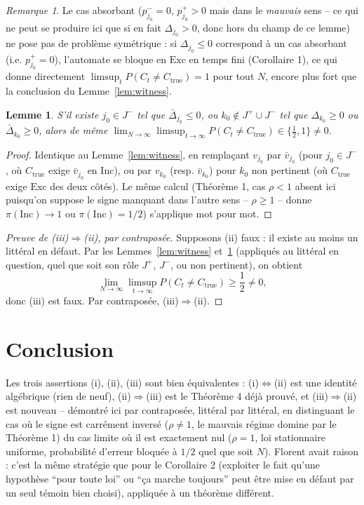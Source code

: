 \documentclass[11pt]{article}
\newtheorem{lemma}{Lemme}
\theoremstyle{remark}
\newtheorem{remark}[theorem]{Remarque}
\newcommand{\Inc}{\ensuremath{\mathrm{Inc}}}
\newcommand{\Exc}{\ensuremath{\mathrm{Exc}}}
\newcommand{\vbar}{\bar{v}}
\begin{document}
\begin{remark}
Le cas absorbant ($p_{j_0}^-=0$, $p_{j_0}^+>0$ mais dans le \emph{mauvais}
sens -- ce qui ne peut se produire ici que si en fait $\Delta_{j_0}>0$, donc
hors du champ de ce lemme) ne pose pas de problème symétrique : si
$\Delta_{j_0}\le0$ correspond à un cas absorbant (i.e. $p_{j_0}^+=0$),
l'automate se bloque en $\Exc$ en temps fini (Corollaire 1), ce qui donne
directement $\limsup_t P(C_t\ne C_{\mathrm{true}})=1$ pour tout $N$, encore
plus fort que la conclusion du Lemme~\ref{lem:witness}.
\end{remark}

\begin{lemma}\label{lem:witness-neg}
S'il existe $j_0\in J^-$ tel que $\bar\Delta_{j_0}\le0$, ou $k_0\notin
J^+\cup J^-$ tel que $\Delta_{k_0}\ge0$ ou $\bar\Delta_{k_0}\ge0$, alors de
même $\lim_{N\to\infty}\limsup_{t\to\infty}P(C_t\ne C_{\mathrm{true}})\in\{\tfrac12,1\}\ne0$.
\end{lemma}

\begin{proof}
Identique au Lemme~\ref{lem:witness}, en remplaçant $v_{j_0}$ par
$\vbar_{j_0}$ (pour $j_0\in J^-$, où $C_{\mathrm{true}}$ exige $\vbar_{j_0}$
en $\Inc$), ou par $v_{k_0}$ (resp. $\vbar_{k_0}$) pour $k_0$ non pertinent
(où $C_{\mathrm{true}}$ exige $\Exc$ des deux côtés). Le même calcul
(Théorème 1, cas $\rho<1$ absent ici puisqu'on suppose le signe manquant
dans l'autre sens -- $\rho\ge1$ -- donne $\pi(\Inc)\to1$ ou $\pi(\Inc)=1/2$)
s'applique mot pour mot.
\end{proof}

\begin{proof}[Preuve de (iii)$\Rightarrow$(ii), par contraposée]
Supposons (ii) faux : il existe au moins un littéral en défaut. Par les
Lemmes~\ref{lem:witness} et~\ref{lem:witness-neg} (appliqués au littéral en
question, quel que soit son rôle $J^+$, $J^-$, ou non pertinent), on obtient
\[
  \lim_{N\to\infty}\limsup_{t\to\infty}P(C_t\ne C_{\mathrm{true}}) \ge \frac12 \ne 0,
\]
donc (iii) est faux. Par contraposée, (iii)$\Rightarrow$(ii).
\end{proof}

\section{Conclusion}

Les trois assertions (i), (ii), (iii) sont bien équivalentes : (i)$\iff$(ii)
est une identité algébrique (rien de neuf), (ii)$\Rightarrow$(iii) est le
Théorème 4 déjà prouvé, et (iii)$\Rightarrow$(ii) est nouveau -- démontré
ici par contraposée, littéral par littéral, en distinguant le cas où le
signe est carrément inversé ($\rho\ne1$, le mauvais régime domine par le
Théorème 1) du cas limite où il est exactement nul ($\rho=1$, loi
stationnaire uniforme, probabilité d'erreur bloquée à $1/2$ quel que soit
$N$). Florent avait raison : c'est la même stratégie que pour le Corollaire 2
(exploiter le fait qu'une hypothèse ``pour toute loi'' ou ``ça marche
toujours'' peut être mise en défaut par un seul témoin bien choisi), appliquée
à un théorème différent.
\end{document}
